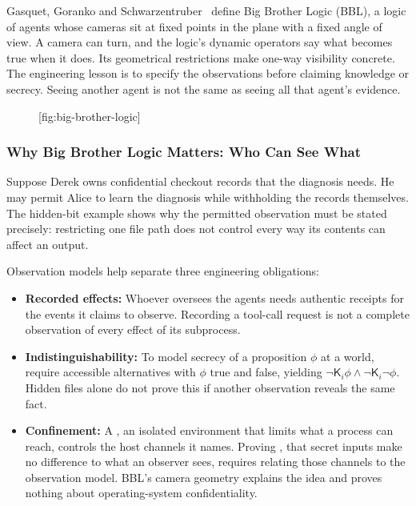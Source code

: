 Gasquet, Goranko and Schwarzentruber~ define
Big Brother Logic (BBL), a logic of agents whose cameras sit at fixed points
in the plane with a fixed angle of view. A camera can turn, and the logic's
dynamic operators say what becomes true when it does. Its geometrical
restrictions make one-way visibility concrete. The engineering lesson is to
specify the observations before claiming knowledge or secrecy.
Seeing another agent is not the same as seeing all that agent's evidence.


\begin{figure}[tp]
  \centering
  [fig:big-brother-logic]
\end{figure}


\subsubsection{Why Big Brother Logic Matters: Who Can See What}
\label{sec:why-bbl-matters}

Suppose Derek owns confidential checkout records that the diagnosis needs. He may permit Alice to learn the diagnosis while withholding the records themselves. The hidden-bit example shows why the permitted observation must be stated precisely: restricting one file path does not control every way its contents can affect an output.

Observation models help separate three engineering obligations:
\begin{itemize}[leftmargin=1.8em,itemsep=2pt]
  \item \textbf{Recorded effects:} Whoever oversees the agents needs authentic receipts for the events it claims to observe. Recording a tool-call request is not a complete observation of every effect of its subprocess.
  \item \textbf{Indistinguishability:} To model secrecy of a proposition $\phi$ at a world, require accessible alternatives with $\phi$ true and false, yielding $\neg \mathsf{K}_i\phi\land\neg \mathsf{K}_i\neg\phi$. Hidden files alone do not prove this if another observation reveals the same fact.
  \item \textbf{Confinement:} A , an isolated environment that limits what a process can reach, controls the host channels it names. Proving , that secret inputs make no difference to what an observer sees, requires relating those channels to the observation model. BBL's camera geometry explains the idea and proves nothing about operating-system confidentiality.
\end{itemize}

